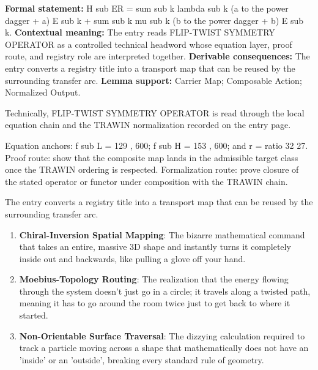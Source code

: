 \begingroup\footnotesize\setlength{\emergencystretch}{3em}\sloppy
\textbf{Formal statement:} H sub ER = sum sub k lambda sub k (a to the power dagger + a) E sub k + sum sub k mu sub k (b to the power dagger + b) E sub k. \textbf{Contextual meaning:} The entry reads FLIP-TWIST SYMMETRY OPERATOR as a controlled technical headword whose equation layer, proof route, and registry role are interpreted together. \textbf{Derivable consequences:} The entry converts a registry title into a transport map that can be reused by the surrounding transfer arc. \textbf{Lemma support:} Carrier Map; Composable Action; Normalized Output.\par
\endgroup

Technically, FLIP-TWIST SYMMETRY OPERATOR is read through the local equation chain and the TRAWIN normalization recorded on the entry page.

Equation anchors: f sub L = 129 , 600; f sub H = 153 , 600; and r = ratio 32 27. Proof route: show that the composite map lands in the admissible target class once the TRAWIN ordering is respected. Formalization route: prove closure of the stated operator or functor under composition with the TRAWIN chain.

The entry converts a registry title into a transport map that can be reused by the surrounding transfer arc.
\endgroup

\begin{enumerate}[leftmargin=1.6em,itemsep=6pt,topsep=4pt]
\item \textbf{Chiral-Inversion Spatial Mapping}: The bizarre mathematical command that takes an entire, massive 3D shape and instantly turns it completely inside out and backwards, like pulling a glove off your hand.
\item \textbf{Moebius-Topology Routing}: The realization that the energy flowing through the system doesn't just go in a circle; it travels along a twisted path, meaning it has to go around the room twice just to get back to where it started.
\item \textbf{Non-Orientable Surface Traversal}: The dizzying calculation required to track a particle moving across a shape that mathematically does not have an 'inside' or an 'outside', breaking every standard rule of geometry.
\end{enumerate}

